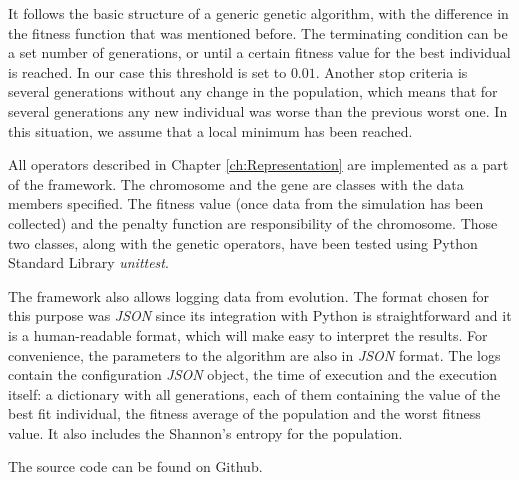 It follows the basic structure of a generic genetic algorithm, with the difference in the fitness function that was mentioned before. The terminating condition can be a set number of generations, or until a certain fitness value for the best individual is reached. In our case this threshold is set to $0.01$. Another stop criteria is several generations without any change in the population, which means that for several generations any new individual was worse than the previous worst one. In this situation, we assume that a local minimum has been reached.

All operators described in Chapter \ref{ch:Representation} are implemented as a part of the framework. The chromosome and the gene are classes with the data members specified. The fitness value (once data from the simulation has been collected) and the penalty function are responsibility of the chromosome. Those two classes, along with the genetic operators, have been tested using Python Standard Library \textit{unittest}.

The framework also allows logging data from evolution. The format chosen for this purpose was \textit{JSON} since its integration with Python is straightforward and it is a human-readable format, which will make easy to interpret the results. For convenience, the parameters to the algorithm are also in \textit{JSON} format. The logs contain the configuration \textit{JSON} object, the time of execution and the execution itself: a dictionary with all generations, each of them containing the value of the best fit individual, the fitness average of the population and the worst fitness value. It also includes the Shannon's entropy for the population. 

The source code can be found on Github\cite{ab-level}.

